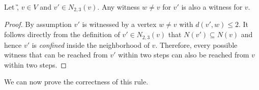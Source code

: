 \begin{fact}\label{fact:witnessTwin}
Let \G, $v \in V$ and $v' \in N_{2,3}(v)$. Any witness $w \neq v$ for $v'$ is also a witness for $v$. %
\end{fact}
\begin{proof}
By assumption $v'$ is witnessed by a vertex $w \neq v$ with $d(v', w) \leq 2$. It follows directly from the definition of $v' \in N_{2,3}(v)$ that $N(v') \subseteq N(v)$ and hence $v'$ is \textit{confined} inside the neighborhood of $v$. Therefore, every possible witness that can be reached from $v'$ within two steps can also be reached from $v$ within two steps.

\end{proof}

We can now prove the correctness of this rule.

